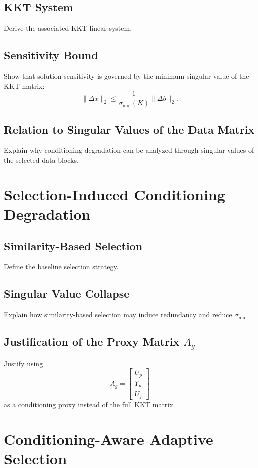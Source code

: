 \documentclass{article}
\theoremstyle{definition}
\begin{document}
\subsection{KKT System}
Derive the associated KKT linear system.

\subsection{Sensitivity Bound}
Show that solution sensitivity is governed by the minimum singular value of the KKT matrix:
\[
\|\Delta x\|_2 \le \frac{1}{\sigma_{\min}(K)} \|\Delta b\|_2.
\]

\subsection{Relation to Singular Values of the Data Matrix}
Explain why conditioning degradation can be analyzed through singular values of the selected data blocks.



\section{Selection-Induced Conditioning Degradation}

\subsection{Similarity-Based Selection}
Define the baseline selection strategy.

\subsection{Singular Value Collapse}
Explain how similarity-based selection may induce redundancy and reduce $\sigma_{\min}$.

\subsection{Justification of the Proxy Matrix $A_g$}
Justify using
\[
A_g = \begin{bmatrix} U_p \\ Y_p \\ U_f \end{bmatrix}
\]
as a conditioning proxy instead of the full KKT matrix.



\section{Conditioning-Aware Adaptive Selection}
\end{document}
